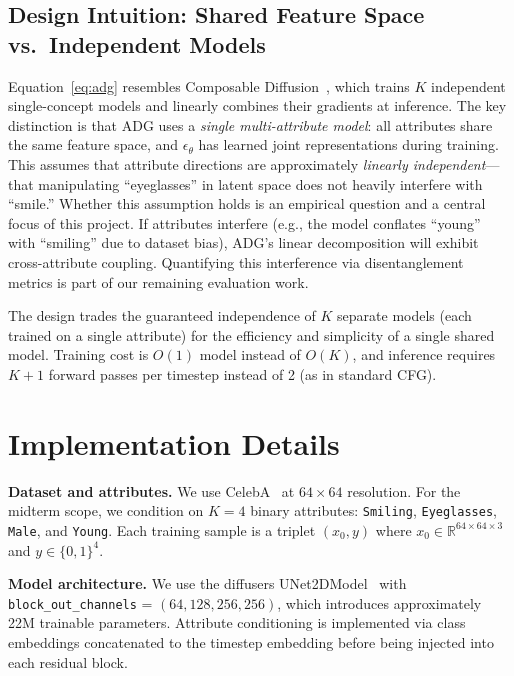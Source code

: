 \documentclass{article}
\begin{document}
\subsection{Design Intuition: Shared Feature Space vs.\ Independent Models}

Equation~\eqref{eq:adg} resembles Composable Diffusion~\citep{liu2022composable}, which trains $K$ independent single-concept models and linearly combines their gradients at inference. The key distinction is that ADG uses a \emph{single multi-attribute model}: all attributes share the same feature space, and $\epsilon_\theta$ has learned joint representations during training. This assumes that attribute directions are approximately \emph{linearly independent}—that manipulating ``eyeglasses'' in latent space does not heavily interfere with ``smile.'' Whether this assumption holds is an empirical question and a central focus of this project. If attributes interfere (e.g., the model conflates ``young'' with ``smiling'' due to dataset bias), ADG's linear decomposition will exhibit cross-attribute coupling. Quantifying this interference via disentanglement metrics is part of our remaining evaluation work.

The design trades the guaranteed independence of $K$ separate models (each trained on a single attribute) for the efficiency and simplicity of a single shared model. Training cost is $O(1)$ model instead of $O(K)$, and inference requires $K{+}1$ forward passes per timestep instead of 2 (as in standard CFG).

\section{Implementation Details}
\label{sec:impl}

\textbf{Dataset and attributes.} We use CelebA~\citep{liu2015celeba} at $64{\times}64$ resolution. For the midterm scope, we condition on $K{=}4$ binary attributes: \texttt{Smiling}, \texttt{Eyeglasses}, \texttt{Male}, and \texttt{Young}. Each training sample is a triplet $(x_0, y)$ where $x_0 \in \mathbb{R}^{64 \times 64 \times 3}$ and $y \in \{0,1\}^4$.

\textbf{Model architecture.} We use the diffusers UNet2DModel~\citep{diffusers} with \texttt{block\_out\_channels} = $(64, 128, 256, 256)$, which introduces approximately 22M trainable parameters. Attribute conditioning is implemented via class embeddings concatenated to the timestep embedding before being injected into each residual block.
\end{document}
